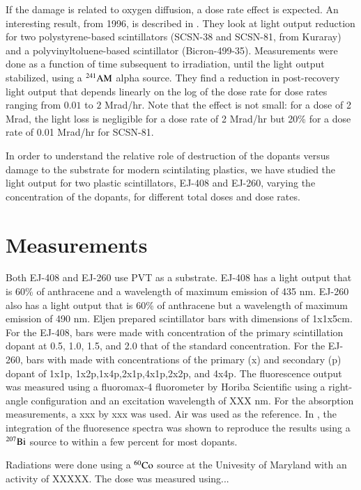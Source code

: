 \documentclass[review]{elsarticle}
\begin{document}
If the damage is related to oxygen diffusion, a dose rate effect
is expected.
An interesting result, from 1996, is described in \cite{Biagtan1996125}.  They look at light output reduction for two
polystyrene-based scintillators (SCSN-38 and SCSN-81, from Kuraray) and a
polyvinyltoluene-based scintillator (Bicron-499-35).  
Measurements were done as a function of time subsequent to irradiation, until the light output stabilized, using a ${\rm ^{241}AM}$ alpha source.
They find a reduction in post-recovery light output that depends linearly on the
log of the dose rate for dose rates ranging from $0.01$ to
$2$ Mrad/hr.  Note that the effect is not small: for a
dose of 2 Mrad, the light loss is negligible for a dose rate
of 2 Mrad/hr but 20\% for a dose rate of 0.01 Mrad/hr for SCSN-81.

In order to understand the relative role of destruction of the dopants versus damage to the substrate for modern scintilating plastics,
we have studied the light output for two plastic scintillators, EJ-408 and EJ-260, varying the concentration of the dopants, for
different total doses and dose rates.  




\section{Measurements}
Both EJ-408 and EJ-260 use PVT as a substrate.  EJ-408 has a light output that is 60\% of anthracene and a wavelength of maximum emission of 435 nm.  
EJ-260 also has a light output that is 60\% of anthracene but a wavelength of maximum emission of 490 nm.  Eljen prepared scintillator bars
with dimensions of 1x1x5cm.  For the EJ-408, bars were made with concentration of the primary scintillation dopant at 0.5, 1.0, 1.5, and 2.0 that of
the standard concentration.  For the EJ-260, bars with made with concentrations of the primary (x) and secondary (p) dopant of 1x1p, 1x2p,1x4p,2x1p,4x1p,2x2p, and 4x4p.
The fluorescence output was measured using a fluoromax-4 fluorometer by Horiba Scientific using a right-angle configuration and an excitation wavelength of
XXX nm.  For the absorption measurements, a xxx by xxx was used.
Air was used as the reference.  In \cite{Bross199135}, the integration
of the fluoresence spectra was shown to reproduce the results using a
$\rm{^{207}Bi}$ source to within a few percent for most dopants.

Radiations were done using a ${\rm ^{60}Co}$ source at the Univesity of Maryland with an activity of XXXXX.  
The dose was measured using...
\end{document}
